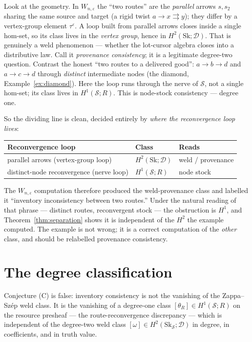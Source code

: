 \documentclass[11pt]{article}
\theoremstyle{definition}
\newcommand{\Sc}{\mathcal{S}}
\newcommand{\D}{\mathcal{D}}
\newcommand{\Sk}{\mathrm{Sk}}
\begin{document}
Look at the geometry. In $W_{n,\varepsilon}$ the ``two routes'' are the \emph{parallel} arrows
$s,s_2$ sharing the same source and target (a rigid twist $a\to x\rightrightarrows y$); they
differ by a vertex-group element $\tau^\varepsilon$. A loop built from parallel arrows closes
inside a single hom-set, so its class lives in the \emph{vertex group}, hence in
$H^2(\Sk;\D)$. That is genuinely a weld phenomenon --- whether the lot-cursor algebra closes
into a distributive law. Call it \emph{provenance consistency}; it is a legitimate degree-two
question. Contrast the honest ``two routes to a delivered good'': $a\to b\to d$ and $a\to c\to d$
through \emph{distinct} intermediate nodes (the diamond, Example~\ref{ex:diamond}). Here the loop
runs through the nerve of $\Sc$, not a single hom-set; its class lives in $H^1(\Sc;R)$. This is
node-stock consistency --- degree one.

So the dividing line is clean, decided entirely by \emph{where the reconvergence loop lives}:
\begin{center}
\begin{tabular}{@{}lll@{}}
\toprule
Reconvergence loop & Class & Reads \\
\midrule
parallel arrows (vertex-group loop) & $H^2(\Sk;\D)$ & weld / provenance \\
distinct-node reconvergence (nerve loop) & $H^1(\Sc;R)$ & node stock \\
\bottomrule
\end{tabular}
\end{center}
The $W_{n,\varepsilon}$ computation therefore produced the weld-provenance class and labelled it
``inventory inconsistency between two routes.'' Under the natural reading of that phrase ---
distinct routes, reconvergent stock --- the obstruction is $H^1$, and
Theorem~\ref{thm:separation} shows it is independent of the $H^2$ the example computed. The
example is not wrong; it is a correct computation of the \emph{other} class, and should be
relabelled provenance consistency.

\section{The degree classification}\label{sec:conclusion}

Conjecture (C) is false: inventory consistency is not the vanishing of the Zappa--Sz\'ep weld
class. It is the vanishing of a degree-one class $[\theta_R]\in H^1(\Sc;R)$ on the resource
presheaf --- the route-reconvergence discrepancy --- which is independent of the degree-two weld
class $[\omega]\in H^2(\Sk_\Sc;\D)$ in degree, in coefficients, and in truth value.
\end{document}
